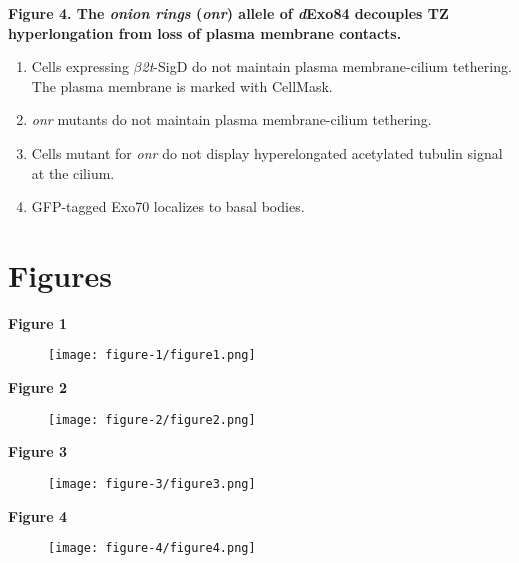 \documentclass[12pt, twoside, letterpaper]{article}
\newcommand{\sigd}{$\beta$\textit{2t}-SigD}
\begin{document}
\begin{doublespacing}
\begin{linenumbers}
    \textbf{Figure 4. The \textit{onion rings} (\textit{onr}) allele of \textit{d}Exo84 decouples TZ hyperlongation from loss of plasma membrane contacts.}
    \begin{enumerate}[label={(\Alph*)}, nolistsep]
    \item Cells expressing \sigd{} do not maintain plasma membrane-cilium tethering. The plasma membrane is marked with CellMask.
    \item \textit{onr} mutants do not maintain plasma membrane-cilium tethering.
    \item Cells mutant for \textit{onr} do not display hyperelongated acetylated tubulin signal at the cilium.
    \item GFP-tagged Exo70 localizes to basal bodies.
    \end{enumerate}
    
  \end{linenumbers}
\end{doublespacing}



\newpage

\section{Figures}

\textbf{Figure 1}
\begin{figure}[ht]
  \texttt{[image: figure-1/figure1.png]}
\end{figure}
\newpage

\textbf{Figure 2}
\begin{figure}[ht]
  \texttt{[image: figure-2/figure2.png]}
\end{figure}
\newpage

\textbf{Figure 3}
\begin{figure}[ht]
  \texttt{[image: figure-3/figure3.png]}
\end{figure}
\newpage

\textbf{Figure 4}
\begin{figure}[ht]
  \texttt{[image: figure-4/figure4.png]}
\end{figure}
\newpage
\end{document}
